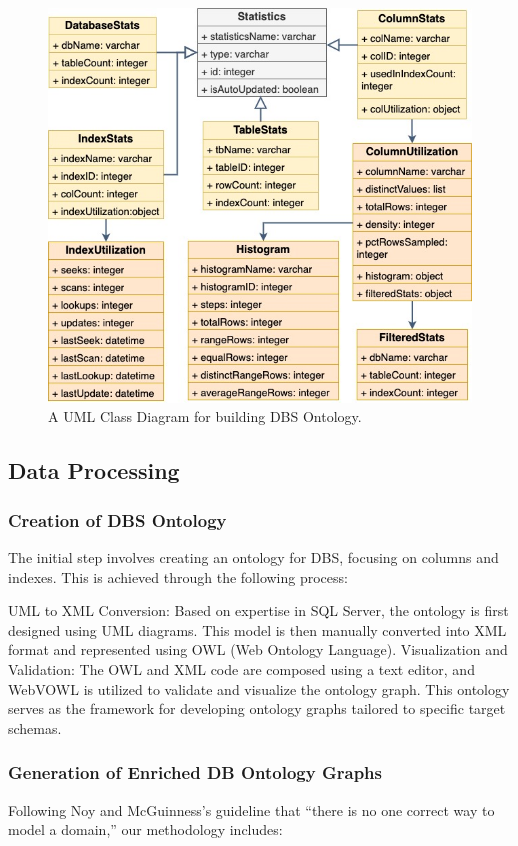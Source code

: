 \documentclass[sigconf]{acmart}
\begin{document}
\begin{figure}[h]
	\centering
	\includegraphics[width=\linewidth]{uml-db-statistic}
	\caption{A UML Class Diagram for building DBS Ontology.}
	\label{statistics-class-diagram}
\end{figure}

\subsection{Data Processing}

\subsubsection{Creation of DBS Ontology}
The initial step involves creating an ontology for DBS, focusing on columns and indexes. This is achieved through the following process:

UML to XML Conversion: Based on expertise in SQL Server, the ontology is first designed using UML diagrams. This model is then manually converted into XML format and represented using OWL (Web Ontology Language).
Visualization and Validation: The OWL and XML code are composed using a text editor, and WebVOWL is utilized to validate and visualize the ontology graph. This ontology serves as the framework for developing ontology graphs tailored to specific target schemas.

\subsubsection{Generation of Enriched DB Ontology Graphs}
Following Noy and McGuinness's guideline that “there is no one correct way to model a domain,” our methodology includes:
\end{document}
